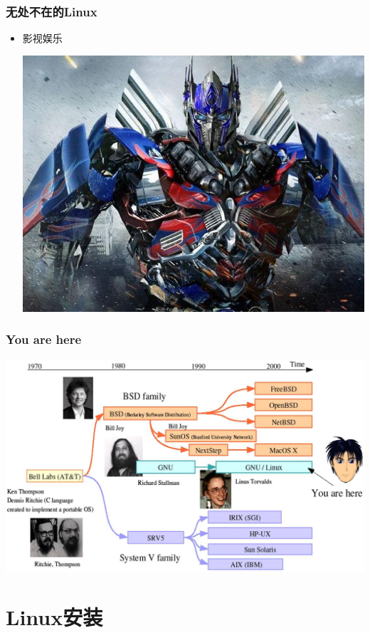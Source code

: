 \documentclass[xcolor=svgnames,presentation]{beamer}
\begin{document}
\begin{frame}
\frametitle{无处不在的Linux}
\label{sec-2-4-11}
\begin{itemize}

\item 影视娱乐
\label{sec-2-4-11-1}%
\begin{center}
\includegraphics[width=.9\linewidth]{img/jingang.jpg}
\end{center}

\end{itemize} %
\end{frame}
\begin{frame}
\frametitle{You are here}
\label{sec-2-4-12}

\begin{center}
\includegraphics[width=.9\linewidth]{img/here.jpg}
\end{center}
\end{frame}
\section{Linux安装}
\label{sec-3}
\end{document}
